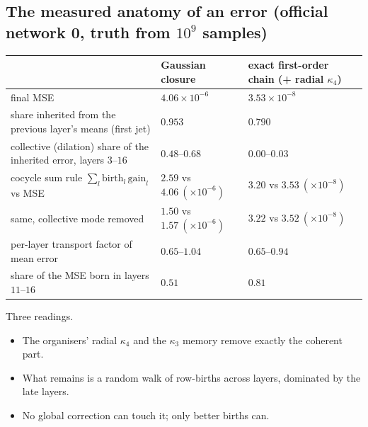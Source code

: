 \subsection{The measured anatomy of an error (official network 0, truth from $10^9$ samples)}
\begin{center}\small
\begin{tabular}{>{\raggedright\arraybackslash}p{6.3cm}>{\centering\arraybackslash}p{3.4cm}>{\centering\arraybackslash}p{3.9cm}}\toprule
& Gaussian closure & exact first-order chain (+ radial $\kappa_4$)\\\midrule
final MSE & $4.06\times10^{-6}$ & $3.53\times10^{-8}$\\
share inherited from the previous layer's means (first jet) & $0.953$ & $0.790$\\
collective (dilation) share of the inherited error, layers $3$--$16$ & $0.48$--$0.68$ & $0.00$--$0.03$\\
cocycle sum rule $\sum_l\mathrm{birth}_l\,\mathrm{gain}_l$ vs MSE & $2.59$ vs $4.06\ (\times10^{-6})$ & $3.20$ vs $3.53\ (\times10^{-8})$\\
same, collective mode removed & $1.50$ vs $1.57\ (\times10^{-6})$ & $3.22$ vs $3.52\ (\times10^{-8})$\\
per-layer transport factor of mean error & $0.65$--$1.04$ & $0.65$--$0.94$\\
share of the MSE born in layers $11$--$16$ & $0.51$ & $0.81$\\\bottomrule
\end{tabular}
\end{center}
Three readings.
\begin{itemize}[leftmargin=*]
\item The organisers' radial $\kappa_4$ and the $\kappa_3$ memory remove exactly the coherent part.
\item What remains is a random walk of row-births across layers, dominated by the late layers.
\item No global correction can touch it; only better births can.
\end{itemize}
